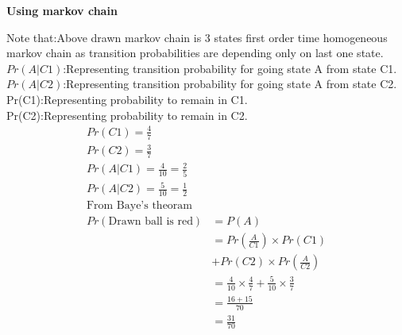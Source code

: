 \documentclass[journel,12pt,twocoloums]{IEEEtran}
\begin{document}
\textbf{Using markov chain} \\
 Note that:Above drawn markov chain is 3 states first order time homogeneous markov chain as transition probabilities are depending only on last one state.\\
 $Pr(A|C1)$:Representing transition probability for going state A from state C1.\\
 $Pr(A|C2)$:Representing transition probability for going state A from state C2.\\
 Pr(C1):Representing  probability to remain in C1.\\
 Pr(C2):Representing  probability to remain in C2.\\
\begin{align*}
Pr(C1)= \frac{4}{7}\\
Pr(C2)=\frac{3}{7}\\
Pr(A|C1)=\frac{4}{10}=\frac{2}{5}\\
Pr(A|C2)=\frac{5}{10}=\frac{1}{2}\\
\text{From Baye's theoram} \\
Pr(\text{Drawn ball is red})&=P(A)\\
                     &=Pr(\frac{A}{C1})\times Pr(C1)\\
                     &    +Pr(C2)\times Pr(\frac{A}{C2})\\
                     &=\frac{4}{10}\times \frac{4}{7}+\frac{5}{10}\times \frac{3}{7}\\
                     &=\frac{16+15}{70}\\
                     &=\frac{31}{70}
\end{align*}
\end{document}
